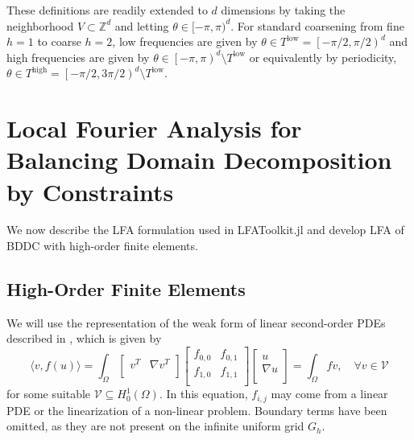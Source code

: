 \documentclass[review]{siamart190516}
\begin{document}
These definitions are readily extended to $d$ dimensions by taking the neighborhood $V \subset \mathbb Z^d$ and letting $\theta \in [-\pi,\pi)^d$.
For standard coarsening from fine $h=1$ to coarse $h=2$, low frequencies are given by $\theta \in T^{\text{low}} = \left[ - \pi / 2, \pi / 2 \right)^d$ and high frequencies are given by $\theta \in \left[-\pi, \pi \right)^d \setminus T^{\text{low}}$ or equivalently by periodicity, $\theta \in T^{\text{high}} = \left[ - \pi / 2, 3 \pi / 2 \right)^d \setminus T^{\text{low}}$.

\section{Local Fourier Analysis for Balancing Domain Decomposition by Constraints}\label{sec:lfa}

We now describe the LFA formulation used in LFAToolkit.jl and develop LFA of BDDC with high-order finite elements.

\subsection{High-Order Finite Elements}\label{sec:highorder}

We will use the representation of the weak form of linear second-order PDEs described in \cite{brown2010efficient}, which is given by
\begin{equation}
\langle v, f \left( u \right) \rangle = \int_{\Omega}
\begin{bmatrix}
  v^T & \nabla v^T    \\
\end{bmatrix}
\begin{bmatrix}
  f_{0, 0} & f_{0, 1} \\
  f_{1, 0} & f_{1, 1} \\
\end{bmatrix}
\begin{bmatrix}
  u                   \\
  \nabla u            \\
\end{bmatrix}
= \int_{\Omega} f v,\quad \forall v \in \mathcal V
\end{equation}
for some suitable $\mathcal V \subseteq H_0^1 \left( \Omega \right)$.
In this equation, $f_{i, j}$ may come from a linear PDE or the linearization of a non-linear problem.
Boundary terms have been omitted, as they are not present on the infinite uniform grid $G_h$.
\end{document}
